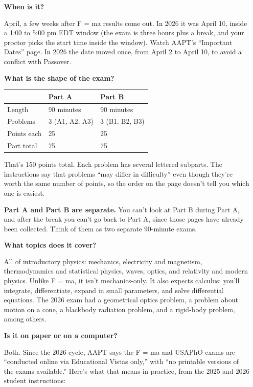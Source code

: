\documentclass[11pt]{article}
\newcommand{\Q}[1]{\par\medskip\noindent\textbf{\color{qblue}#1}\par\nobreak\vspace{1pt}\nobreak}
\begin{document}
\Q{When is it?}
April, a few weeks after F = ma results come out. In 2026 it was April 10, inside a
1:00 to 5:00 pm EDT window (the exam is three hours plus a break, and your proctor picks the
start time inside the window). Watch AAPT's ``Important Dates'' page. In 2026 the date moved
once, from April 2 to April 10, to avoid a conflict with Passover.

\Q{What is the shape of the exam?}

\begin{center}
\begin{tabular}{lll}
\hline
& \textbf{Part A} & \textbf{Part B} \\
\hline
Length        & 90 minutes            & 90 minutes \\
Problems      & 3 (A1, A2, A3)        & 3 (B1, B2, B3) \\
Points each   & 25                    & 25 \\
Part total    & 75                    & 75 \\
\hline
\end{tabular}
\end{center}

That's 150 points total. Each problem has several lettered subparts. The instructions say
that problems ``may differ in difficulty'' even though they're worth the same number of
points, so the order on the page doesn't tell you which one is easiest.

\begin{warnbox}
\textbf{Part A and Part B are separate.} You can't look at Part B during Part A, and after
the break you can't go back to Part A, since those pages have already been collected. Think
of them as two separate 90-minute exams.
\end{warnbox}

\Q{What topics does it cover?}
All of introductory physics: mechanics, electricity and magnetism, thermodynamics and
statistical physics, waves, optics, and relativity and modern physics. Unlike F = ma, it
isn't mechanics-only. It also expects calculus: you'll integrate, differentiate, expand in
small parameters, and solve differential equations. The 2026 exam had a geometrical optics
problem, a problem about motion on a cone, a blackbody radiation problem, and a rigid-body
problem, among others.

\Q{Is it on paper or on a computer?}
Both. Since the 2026 cycle, AAPT says the F = ma and USAPhO exams are ``conducted online
via Educational Vistas only,'' with ``no printable versions of the exams available.''
Here's what that means in practice, from the 2025 and 2026 student instructions:
\end{document}
